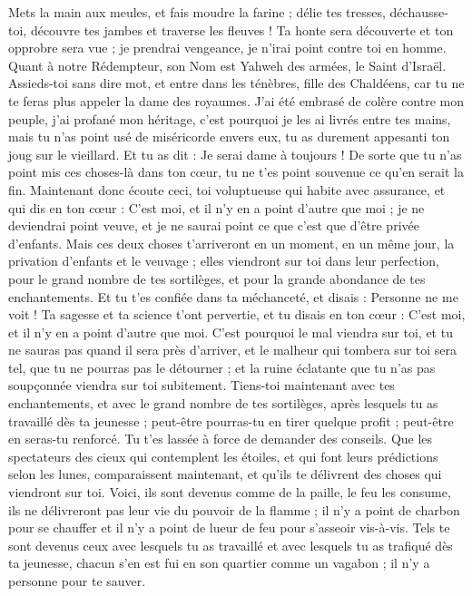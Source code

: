 \begin{multicols}{2}
Mets la main aux meules, et fais moudre la farine ; délie tes tresses, déchausse-toi, découvre tes jambes et traverse les fleuves !
Ta honte sera découverte et ton opprobre sera vue ; je prendrai vengeance, je n'irai point contre toi en homme.
Quant à notre Rédempteur, son Nom est Yahweh des armées, le Saint d'Israël.
Assieds-toi sans dire mot, et entre dans les ténèbres, fille des Chaldéens, car tu ne te feras plus appeler la dame des royaumes.
J'ai été embrasé de colère contre mon peuple, j'ai profané mon héritage, c'est pourquoi je les ai livrés entre tes mains, mais tu n'as point usé de miséricorde envers eux, tu as durement appesanti ton joug sur le vieillard.
Et tu as dit : Je serai dame à toujours ! De sorte que tu n'as point mis ces choses-là dans ton cœur, tu ne t'es point souvenue ce qu'en serait la fin.
Maintenant donc écoute ceci, toi voluptueuse qui habite avec assurance, et qui dis en ton cœur : C'est moi, et il n'y en a point d'autre que moi ; je ne deviendrai point veuve, et je ne saurai point ce que c'est que d'être privée d'enfants.
Mais ces deux choses t'arriveront en un moment, en un même jour, la privation d'enfants et le veuvage ; elles viendront sur toi dans leur perfection, pour le grand nombre de tes sortilèges, et pour la grande abondance de tes enchantements.
Et tu t'es confiée dans ta méchanceté, et disais : Personne ne me voit ! Ta sagesse et ta science t'ont pervertie, et tu disais en ton cœur : C'est moi, et il n'y en a point d'autre que moi.
 C'est pourquoi le mal viendra sur toi, et tu ne sauras pas quand il sera près d'arriver, et le malheur qui tombera sur toi sera tel, que tu ne pourras pas le détourner ; et la ruine éclatante que tu n'as pas soupçonnée viendra sur toi subitement.
Tiens-toi maintenant avec tes enchantements, et avec le grand nombre de tes sortilèges, après lesquels tu as travaillé dès ta jeunesse ; peut-être pourras-tu en tirer quelque profit ; peut-être en seras-tu renforcé.
Tu t'es lassée à force de demander des conseils. Que les spectateurs des cieux qui contemplent les étoiles, et qui font leurs prédictions selon les lunes, comparaissent maintenant, et qu'ils te délivrent des choses qui viendront sur toi.
Voici, ils sont devenus comme de la paille, le feu les consume, ils ne délivreront pas leur vie du pouvoir de la flamme ; il n'y a point de charbon pour se chauffer et il n'y a point de lueur de feu pour s'asseoir vis-à-vis. 
Tels te sont devenus ceux avec lesquels tu as travaillé et avec lesquels tu as trafiqué dès ta jeunesse, chacun s'en est fui en son quartier comme un vagabon ; il n'y a personne pour te sauver.

\end{multicols}
